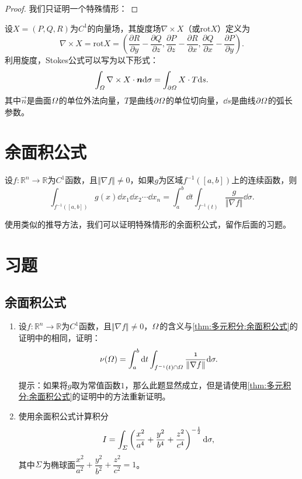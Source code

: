     \begin{proof}
        我们只证明一个特殊情形：
    \end{proof}
    
    设\(X=(P,Q,R)\)为\(C^1\)的向量场，其旋度场\(\nabla\times X\)（或\(\mathrm{rot}X\)）定义为\[\nabla\times X=\mathrm{rot}X=\left(\frac{\partial R}{\partial y}-\frac{\partial Q}{\partial z},\frac{\partial P}{\partial z}-\frac{\partial R}{\partial x},\frac{\partial Q}{\partial x}-\frac{\partial P}{\partial y}\right).\]利用旋度，Stokes公式可以写为以下形式：\[\int_{\mit\Omega}\nabla\times X\cdot\boldsymbol{n}\mathrm{d}\sigma=\int_{\partial\mit\Omega}X\cdot T\mathrm{d} s.\]其中\(\vec{n}\)是曲面\(\mit\Omega\)的单位外法向量，\(T\)是曲线\(\partial\mit\Omega\)的单位切向量，\(\dd s\)是曲线\(\partial\mit\Omega\)的弧长参数。

\section{余面积公式}
    \begin{theorem}[余面积公式] \label{thm:多元积分:余面积公式}
        设\(f:\mathbb{R}^n\to\mathbb{R}\)为\(C^1\)函数，且\(\Vert\nabla f\Vert\neq0\)，如果\(g\)为区域\(f^{-1}(\left[a,b\right])\)上的连续函数，则\[\int_{f^{-1}(\left[a,b\right])}g(x)\dd x_1\dd x_2\cdots\dd x_n=\int_{a}^{b}\dd t\int_{f^{-1}(t)}\frac{g}{\Vert\nabla f\Vert}\dd\sigma.\]
    \end{theorem}

    使用类似的推导方法，我们可以证明特殊情形的余面积公式，留作后面的习题。

\section{习题}
    \subsection{余面积公式}
    \begin{enumerate}
        \item 设\(f:\mathbb{R}^n\to\mathbb{R}\)为\(C^1\)函数，且\(\Vert\nabla f\Vert\neq0\)，\(\mit\Omega\)的含义与\autoref{thm:多元积分:余面积公式}的证明中的相同，证明：\[\nu(\mit\Omega)=\int_{a}^{b}\mathrm{d} t\int_{f^{-1}(t)\cap\mit\Omega}\frac{1}{\Vert\nabla f\Vert}\mathrm{d}\sigma.\]
        
        {\kaishu 提示：如果将\(g\)取为常值函数\(1\)，那么此题显然成立，但是请使用\autoref{thm:多元积分:余面积公式}的证明中的方法重新证明。}

        \item 使用余面积公式计算积分\[I = \int_{\mit\Sigma}\left(\frac{x^2}{a^4}+\frac{y^2}{b^4}+\frac{z^2}{c^4}\right)^{-\frac{1}{2}}\mathrm{d}\sigma,\]其中\(\mit\Sigma\)为椭球面\(\dfrac{x^2}{a^2}+\dfrac{y^2}{b^2}+\dfrac{z^2}{c^2}=1\)。
    \end{enumerate}